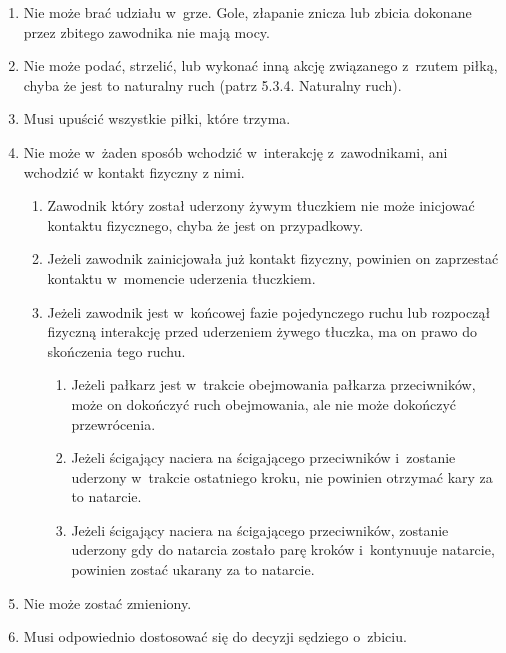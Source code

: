 \documentclass[12pt,a4paper]{article}
\begin{document}
\begin{enumerate}
	\item
	      Nie może brać udziału w~grze. Gole, złapanie znicza lub zbicia
	      dokonane przez zbitego zawodnika nie mają mocy.
	\item
	      Nie może podać, strzelić, lub wykonać inną akcję związanego z~rzutem piłką,
	      chyba że jest to naturalny ruch (patrz 5.3.4. Naturalny ruch).
	\item
	      Musi upuścić wszystkie piłki, które trzyma.
	\item
		Nie może w~żaden sposób wchodzić w~interakcję z~zawodnikami,
		ani wchodzić w kontakt fizyczny z nimi.

	      \begin{enumerate}
		      \item
		            Zawodnik który został uderzony żywym tłuczkiem nie może inicjować
		            kontaktu fizycznego, chyba że jest on przypadkowy.
		      \item
		            Jeżeli zawodnik zainicjowała już kontakt fizyczny, powinien on
		            zaprzestać kontaktu w~momencie uderzenia tłuczkiem.
		      \item
		            Jeżeli zawodnik jest w~końcowej fazie pojedynczego ruchu lub
		            rozpoczął fizyczną interakcję przed uderzeniem żywego tłuczka, ma on
		            prawo do skończenia tego ruchu.

		            \begin{enumerate}
			            \item
			                  Jeżeli pałkarz jest w~trakcie obejmowania pałkarza przeciwników,
			                  może on dokończyć ruch obejmowania, ale nie może dokończyć
			                  przewrócenia.
			            \item
			                  Jeżeli ścigający naciera na ścigającego przeciwników i~zostanie
			                  uderzony w~trakcie ostatniego kroku, nie powinien otrzymać kary za
			                  to natarcie.
			            \item
			                  Jeżeli ścigający naciera na ścigającego przeciwników, zostanie
			                  uderzony gdy do natarcia zostało parę kroków i~kontynuuje
			                  natarcie, powinien zostać ukarany za to natarcie.
		            \end{enumerate}
	      \end{enumerate}
	\item
	      Nie może zostać zmieniony.
	\item
	      Musi odpowiednio dostosować się do decyzji sędziego o~zbiciu.
\end{enumerate}
\end{document}
